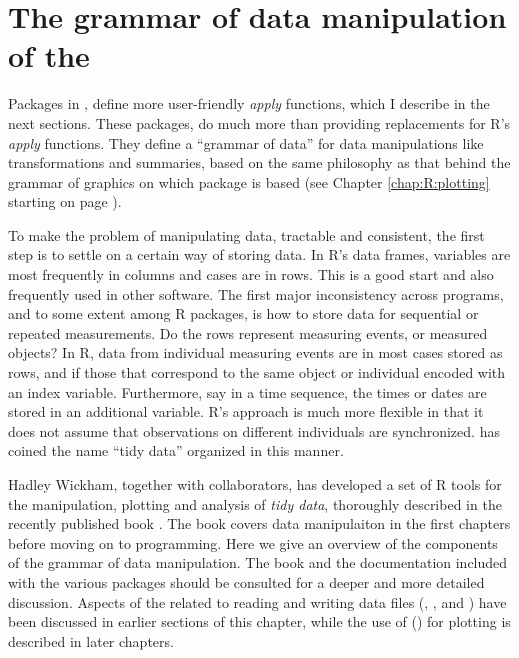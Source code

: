 \documentclass[krantz2]{krantz}\usepackage{knitr}%
\begin{document}
\section[Grammar of data manipulation]{The grammar of data manipulation of the }

Packages in , define more user-friendly \emph{apply} functions, which I describe in the next sections. These packages, do much more than providing replacements for R's \emph{apply} functions. They define a ``grammar of data'' for data manipulations like transformations and summaries, based on the same philosophy as that behind the grammar of graphics on which package  is based (see Chapter \ref{chap:R:plotting} starting on page \pageref{chap:R:plotting}).

To make the problem of manipulating data, tractable and consistent, the first step is to settle on a certain way of storing data. In R's data frames, variables are most frequently in columns and cases are in rows. This is a good start and also frequently used in other software. The first major inconsistency across programs, and to some extent among R packages, is how to store data for sequential or repeated measurements. Do the rows represent measuring events, or measured objects? In R, data from individual measuring events are in most cases stored as rows, and if those that correspond to the same object or individual encoded with an index variable. Furthermore, say in a time sequence, the times or dates are stored in an additional variable. R's approach is much more flexible in that it does not assume that observations on different individuals are synchronized. \citeauthor{Wickham2014a} \cite{Wickham2014a} has coined the name ``tidy data'' organized in this manner.

Hadley Wickham, together with collaborators, has developed a set of R tools for the manipulation, plotting and analysis of \emph{tidy data}, thoroughly described in the recently published book  \autocite{Wickham2017}. The book  \autocite{Peng2017} covers data manipulaiton in the first chapters before moving on to programming. Here we give an overview of the components of the  grammar of data manipulation. The book  and the documentation included with the various packages should be consulted for a deeper and more detailed discussion. Aspects of the  related to reading and writing data files (, , and ) have been discussed in earlier sections of this chapter, while the use of () for plotting is described in later chapters.
\end{document}
